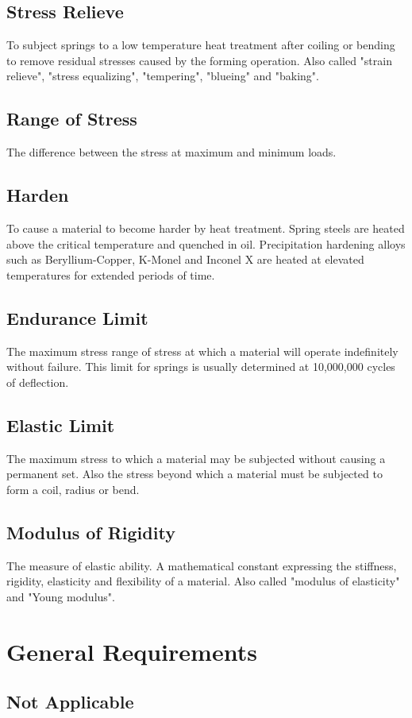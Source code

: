 \documentclass[10pt]{article}
\begin{document}
\subsection{Stress Relieve}
To subject springs to a low temperature heat treatment after coiling or bending to remove residual stresses caused by the forming operation. 
Also called "strain relieve", "stress equalizing", "tempering", "blueing" and "baking".
\subsection{Range of Stress}
The difference between the stress at maximum and minimum loads.
\subsection{Harden}
To cause a material to become harder by heat treatment. 
Spring steels are heated above the critical temperature and quenched in oil. 
Precipitation hardening alloys such as Beryllium-Copper, K-Monel and Inconel X are heated at elevated temperatures for extended periods of time.
\subsection{Endurance Limit}
The maximum stress range of stress at which a material will operate indefinitely without failure. 
This limit for springs is usually determined at 10,000,000 cycles of deflection.
\subsection{Elastic Limit}
The maximum stress to which a material may be subjected without causing a permanent set. 
Also the stress beyond which a material must be subjected to form a coil, radius or bend.
\subsection{Modulus of Rigidity}
The measure of elastic ability. 
A mathematical constant expressing the stiffness, rigidity, elasticity and flexibility of a material. 
Also called "modulus of elasticity" and "Young modulus".

\section{General Requirements}
\subsection{Not Applicable}
\end{document}
